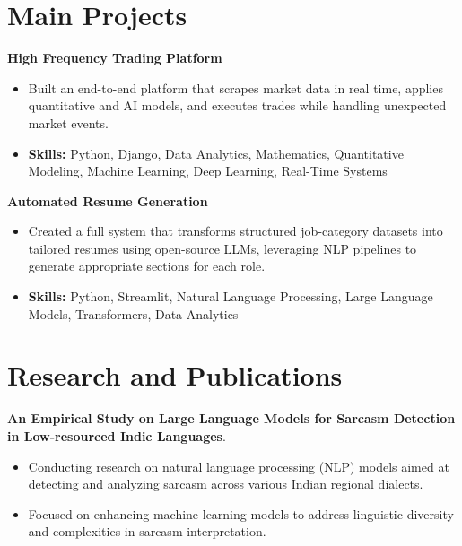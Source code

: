 \documentclass[a4paper,11pt]{article}
\begin{document}
\section{\textbf{Main Projects}}

\vspace{1mm}
  \textbf{High Frequency Trading Platform  }
\vspace{-1.5mm} %
\begin{itemize}
  \item Built an end-to-end platform that scrapes market data in real time, applies quantitative and AI models, and executes trades while handling unexpected market events.
\vspace{-3mm}
  \item \textbf{Skills:} Python, Django, Data Analytics, Mathematics, Quantitative Modeling, Machine Learning, Deep Learning, Real-Time Systems
\end{itemize}


\vspace{1mm}
   \textbf{Automated Resume Generation }
\vspace{-1.5mm} %
\begin{itemize}
  \item Created a full system that transforms structured job-category datasets into tailored resumes using open-source LLMs, leveraging NLP pipelines to generate appropriate sections for each role.
\vspace{-3mm}
  \item \textbf{Skills:} Python, Streamlit, Natural Language Processing, Large Language Models, Transformers, Data Analytics
\end{itemize}



\section{\textbf{Research and Publications} \hfill }
\vspace{1mm}
  \textbf{An Empirical Study on Large Language Models for Sarcasm Detection in Low-resourced Indic Languages}.
\vspace{-1mm} %
\begin{itemize}
  \item Conducting research on natural language processing (NLP) models aimed at detecting and analyzing sarcasm across various Indian regional dialects.
\vspace{-3mm}
  \item Focused on enhancing machine learning models to address linguistic diversity and complexities in sarcasm interpretation.
\end{itemize}
\end{document}
